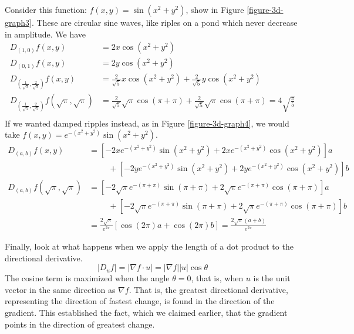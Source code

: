 \documentclass[fleqn,letterpaper]{report}
\begin{document}
\begin{example}
Consider this function: $f(x,y) = \sin (x^2 + y^2)$, show in
Figure \ref{figure-3d-graph3}. These are circular sine waves, like
riples on a pond which never decrease in amplitude. We have
\begin{align*}
D_{(1,0)} f(x,y) & = 2x \cos (x^2 + y^2) \\
D_{(0,1)} f(x,y) & = 2y \cos (x^2 + y^2) \\
D_{ \left( \frac{1}{\sqrt{5}} , \frac{2}{\sqrt{5}} \right) } 
f(x,y) & = \frac{2}{\sqrt{5}} x \cos (x^2 + y^2) +
\frac{2}{\sqrt{5}}y \cos (x^2 + y^2)\\
D_{ \left( \frac{1}{\sqrt{5}} , \frac{2}{\sqrt{5}} \right) }
f(\sqrt{\pi},\sqrt{\pi}) & =
\frac{2}{\sqrt{5}} \sqrt{\pi} \cos (\pi + \pi) +
\frac{2}{\sqrt{5}} \sqrt{\pi} \cos (\pi + \pi) = 4 \sqrt{
\frac{\pi}{5}} \\
\end{align*}
If we wanted damped ripples instead, as in Figure
\ref{figure-3d-graph4}, we would take $f(x,y) = e^{-(x^2 + y^2)}
\sin(x^2 + y^2)$. 
\begin{align*}
D_{(a,b)} f(x,y) & = \left[ -2xe^{-(x^2+y^2)} \sin (x^2 + y^2) +
2xe^{-(x^2+y^2)} \cos (x^2 + y^2) \right] a \\
& \hspace{1cm} + \left[ -2ye^{-(x^2+y^2)} \sin (x^2 + y^2) +
2ye^{-(x^2+y^2)} \cos (x^2 + y^2) \right] b \\
D_{(a,b)} f(\sqrt{\pi},\sqrt{\pi}) & = 
\left[ -2\sqrt{\pi}e^{-(\pi+\pi)} \sin (\pi + \pi) +
2\sqrt{\pi}e^{-(\pi+\pi)} \cos (\pi + \pi) \right] a \\
& \hspace{1cm} + 
\left[ -2\sqrt{\pi}e^{-(\pi + \pi )} \sin (\pi + \pi ) +
2\sqrt{\pi}e^{-(\pi + \pi )} \cos (\pi + \pi) \right] b \\
& = \frac{2\sqrt{\pi}}{e^{2\pi}} \left[ \cos (2\pi) a + \cos
(2\pi) b \right] = \frac{2 \sqrt{\pi} (a+b)}{e^{2\pi}}
\end{align*}
\end{example}

Finally, look at what happens when we apply the length of a
dot product to the directional derivative. 
\begin{equation*}
|D_u f| = |\nabla f \cdot u| = |\nabla f||u| \cos \theta
\end{equation*}
The cosine term is maximized when the angle $\theta =0$,
that is, when $u$ is the unit vector in the same direction as
$\nabla f$. That is, the greatest directional derivative,
representing the direction of fastest change, is found in the
direction of the gradient. This established the fact, which we
claimed earlier, that the gradient points in the direction of
greatest change. 
\end{document}
